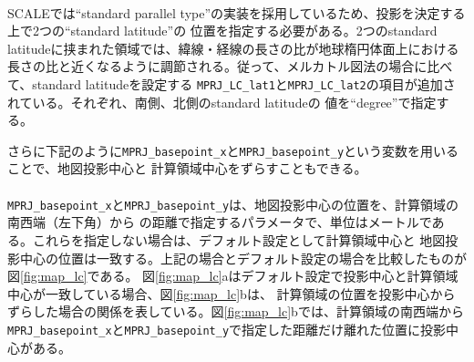 {\small {\gt
{}}}\\

SCALEでは``standard parallel type''の実装を採用しているため、投影を決定する上で2つの``standard latitude''の
位置を指定する必要がある。2つのstandard latitudeに挟まれた領域では、緯線・経線の長さの比が地球楕円体面上における
長さの比と近くなるように調節される。従って、メルカトル図法の場合に比べて、standard latitudeを設定する
\verb|MPRJ_LC_lat1|と\verb|MPRJ_LC_lat2|の項目が追加されている。それぞれ、南側、北側のstandard latitudeの
値を``degree''で指定する。

さらに下記のように\verb|MPRJ_basepoint_x|と\verb|MPRJ_basepoint_y|という変数を用いることで、地図投影中心と
計算領域中心をずらすこともできる。\\

{\small {\gt
{}}}\\

\noindent \verb|MPRJ_basepoint_x|と\verb|MPRJ_basepoint_y|は、地図投影中心の位置を、計算領域の南西端（左下角）から
の距離で指定するパラメータで、単位はメートルである。これらを指定しない場合は、デフォルト設定として計算領域中心と
地図投影中心の位置は一致する。上記の場合とデフォルト設定の場合を比較したものが図\ref{fig:map_lc}である。
図\ref{fig:map_lc}aはデフォルト設定で投影中心と計算領域中心が一致している場合、図\ref{fig:map_lc}bは、
計算領域の位置を投影中心からずらした場合の関係を表している。図\ref{fig:map_lc}bでは、計算領域の南西端から
\verb|MPRJ_basepoint_x|と\verb|MPRJ_basepoint_y|で指定した距離だけ離れた位置に投影中心がある。

